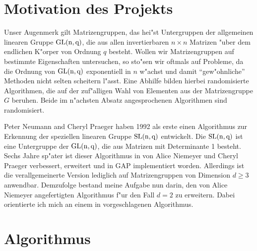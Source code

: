 \documentclass[a4paper,11pt]{article}
\theoremstyle{bla}
\begin{document}

\section{Motivation des Projekts}\label{motivation}

Unser Augenmerk gilt Matrizengruppen, das hei"st Untergruppen der allgemeinen linearen Gruppe $\rm{GL}(n,q)$, die aus allen invertierbaren $n \times n$ Matrizen "uber dem endlichen K"orper von Ordnung $q$ besteht. Wollen wir Matrizengruppen auf bestimmte Eigenschaften untersuchen, so sto"sen wir oftmals auf Probleme, da die Ordnung von $\rm{GL}(n,q)$ exponentiell in $n$ w"achst und damit "`gew"ohnliche"' Methoden nicht selten scheitern l"asst.
Eine Abhilfe bilden hierbei randomisierte Algorithmen, die auf der zuf"alligen Wahl von Elementen aus der Matrizengruppe $G$ beruhen. Beide im n"achsten Absatz angesprochenen Algorithmen sind randomisiert.

Peter Neumann and Cheryl Praeger haben 1992 als erste einen Algorithmus \cite{NP92} zur Erkennung der speziellen linearen Gruppe $\rm{SL}(n,q)$ entwickelt. Die $\rm{SL}(n,q)$ ist eine Untergruppe der $\rm{GL}(n,q)$, die aus Matrizen mit Determinante 1 besteht. Sechs Jahre sp"ater ist dieser Algorithmus in \cite{NP98} von Alice Niemeyer und Cheryl Praeger verbessert, erweitert und in GAP implementiert worden. Allerdings ist die verallgemeinerte Version lediglich auf Matrizengruppen von Dimension $d \geq 3$ anwendbar. Demzufolge bestand meine Aufgabe nun darin, den von Alice Niemeyer angefertigten Algorithmus f"ur den Fall $d = 2$ zu erweitern. Dabei orientierte ich mich an einem in \cite{NP92} vorgeschlagenen Algorithmus.


\section{Algorithmus}\label{algorthmus}

\end{document}
